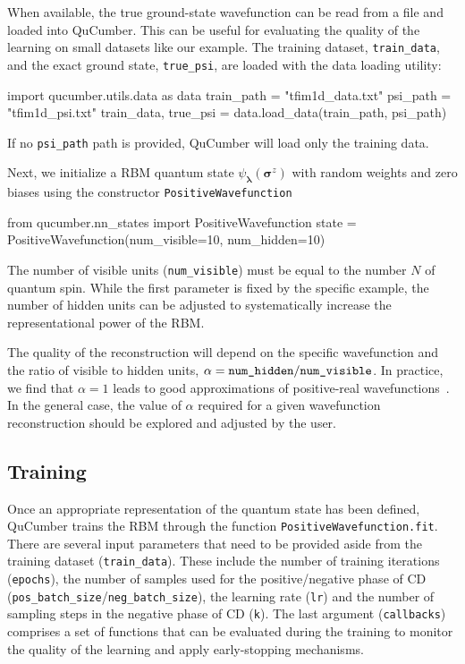 \documentclass[submission, Phys, hidelinks]{SciPost}
\begin{document}
		When available, the true ground-state wavefunction can be read from a file and loaded into QuCumber. This can be useful for evaluating the quality of the learning on small datasets like our example.
		The training dataset, \verb|train_data|, and the exact ground state, \verb|true_psi|, are loaded with the data loading utility:
\begin{python}
import qucumber.utils.data as data
train_path = "tfim1d_data.txt"
psi_path = "tfim1d_psi.txt"
train_data, true_psi = data.load_data(train_path, psi_path)
\end{python}
		If no \verb|psi_path| path is provided, QuCumber will load only the training data. 

		Next, we initialize a RBM quantum state $\psi_{\bm{\lambda}}(\bm{\sigma}^z)$ with random weights and zero biases using the constructor \verb|PositiveWavefunction|
\begin{python}
from qucumber.nn_states import PositiveWavefunction
state = PositiveWavefunction(num_visible=10, num_hidden=10)
\end{python}
		The number of visible units (\verb|num_visible|) must be equal to the number $N$ of quantum spin. While the first parameter is fixed by the specific example, the number of hidden units can be adjusted to systematically increase the representational power of the RBM. 

		The quality of the reconstruction will depend on the specific wavefunction and the ratio of visible to hidden units, $\alpha = \verb|num_hidden|/\verb|num_visible|$.
		In practice, we find that $\alpha = 1$ leads to good approximations of positive-real wavefunctions~\cite{Torlai2016thermo}.
		In the general case, the value of $\alpha$ required for a given wavefunction reconstruction should be explored and adjusted by the user.


	\subsection{Training}
		Once an appropriate representation of the quantum state has been defined, QuCumber trains the RBM through the function \verb|PositiveWavefunction.fit|. There are several input parameters that need to be provided aside from the training dataset (\verb|train_data|). These include the number of training iterations (\verb|epochs|), the number of samples used for the positive/negative phase of CD (\verb|pos_batch_size|/\verb|neg_batch_size|), the learning rate (\verb|lr|) and the number of sampling steps in the negative phase of CD (\verb|k|). The last argument (\verb|callbacks|) comprises a set of functions that can be evaluated during the training to monitor the quality of the learning and apply early-stopping mechanisms. 
\end{document}
